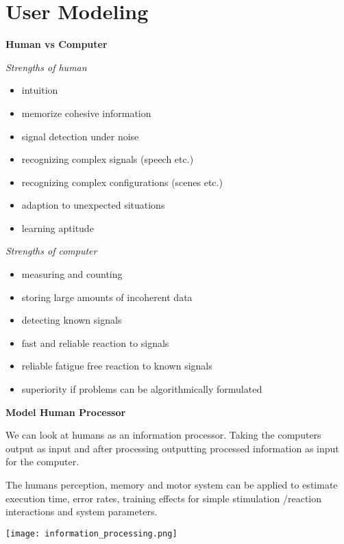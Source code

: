 \section{User Modeling}

\textbf{Human vs Computer}

\textit{Strengths of human} \smallskip

\begin{itemize}[itemsep=-5pt, topsep=0pt, leftmargin=*]
    \item intuition
    \item memorize cohesive information
    \item signal detection under noise
    \item recognizing complex signals (speech etc.)
    \item recognizing complex configurations (scenes etc.)
    \item adaption to unexpected situations
    \item learning aptitude
\end{itemize}

\medskip


\textit{Strengths of computer} \smallskip

\begin{itemize}[itemsep=-5pt, topsep=0pt, leftmargin=*]
    \item measuring and counting
    \item storing large amounts of incoherent data
    \item detecting known signals
    \item fast and reliable reaction to signals
    \item reliable fatigue free reaction to known signals
    \item superiority if problems can be algorithmically formulated
\end{itemize}

\medskip

\textbf{Model Human Processor} \smallskip


We can look at humans as an information processor. Taking the computers output as input and after processing outputting processed information as input for the computer. \smallskip

The humans perception, memory and motor system can be applied to estimate execution time, error rates, training effects for simple stimulation /reaction interactions and system parameters. \smallskip

\begin{center}
	\texttt{[image: information\_processing.png]}
\end{center}



